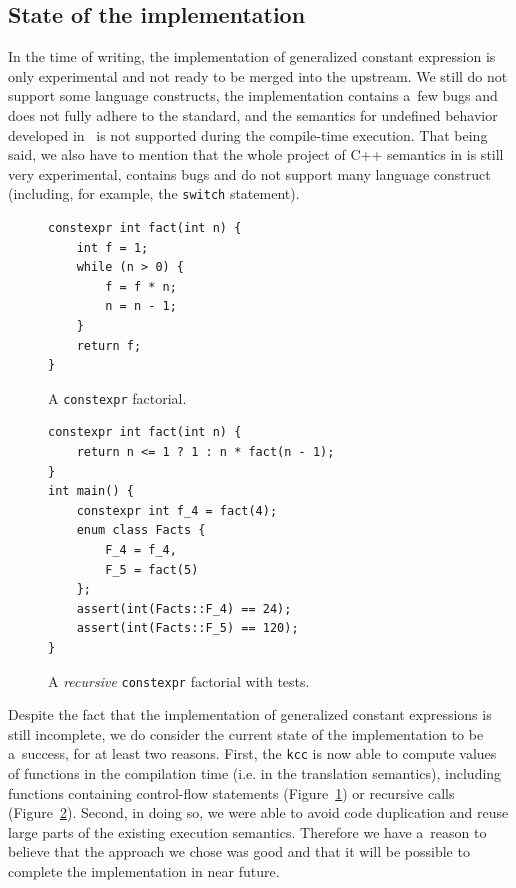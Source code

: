 \documentclass[nolot,nolof,nocover,printed]{fithesis3}
\newcommand{\kcc}{\texttt{kcc}\xspace}
\begin{document}


\subsection{State of the implementation}

In the time of writing, the implementation of generalized constant expression is only experimental and not ready to be merged into the upstream. We still do not support some language constructs, the implementation contains a~few bugs and does not fully adhere to the standard, and the semantics for undefined behavior developed in~\cite{hathhorn-ellison-rosu-2015-pldi} is not supported during the compile-time execution. That being said, we also have to mention that the whole project of C++ semantics in \K is still very experimental, contains bugs and do not support many language construct (including, for example, the \lstinline|switch| statement).



\begin{figure}[ht]
\begin{lstlisting}
constexpr int fact(int n) {
	int f = 1;
	while (n > 0) {
		f = f * n;
		n = n - 1;
	}
	return f;
}
\end{lstlisting}
\caption{A \lstinline|constexpr| factorial.}
\label{fig:constexprFactorial}
\end{figure}

\begin{figure}[ht]
\begin{lstlisting}
constexpr int fact(int n) {
	return n <= 1 ? 1 : n * fact(n - 1);
}
int main() {
	constexpr int f_4 = fact(4);
	enum class Facts {
		F_4 = f_4,
		F_5 = fact(5)
	};
	assert(int(Facts::F_4) == 24);
	assert(int(Facts::F_5) == 120);
}
\end{lstlisting}
\caption{A \textit{recursive} \lstinline|constexpr| factorial with tests.}
\label{fig:recursiveConstexprFactorial}
\end{figure}


Despite the fact that the implementation of generalized constant expressions is still incomplete, we do consider the current state of the implementation to be a~success, for at least two reasons. First, the \kcc is now able to compute values of functions in the compilation time (i.e. in the translation semantics), including functions containing control-flow statements (Figure~\ref{fig:constexprFactorial}) or recursive calls (Figure~\ref{fig:recursiveConstexprFactorial}). Second, in doing so, we were able to avoid code duplication and reuse large parts of the existing execution semantics. Therefore we have a~reason to believe that the approach we chose was good and that it will be possible to complete the implementation in near future.
\end{document}
